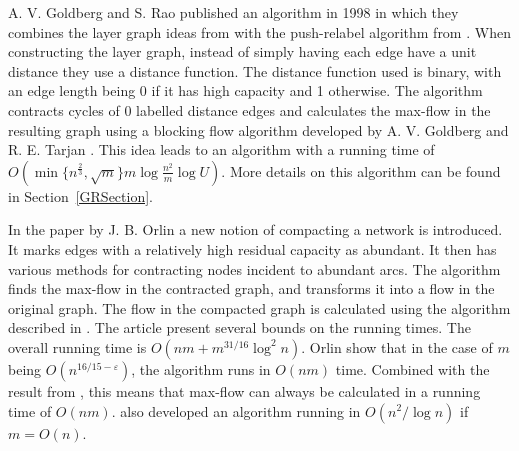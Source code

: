 A. V. Goldberg and S. Rao published an algorithm in 1998 \cite{Goldberg1998} in which they combines the layer graph ideas from \cite{dinic1970}
with the push-relabel algorithm from \cite{Goldberg1988}.
When constructing the layer graph, instead of simply having each edge have a unit distance they
use a distance function. The distance function used is binary, with an edge length 
being 0 if it has high capacity and 1 otherwise. 
The algorithm contracts cycles of 0 labelled distance edges and calculates the max-flow in the resulting graph 
using a blocking flow algorithm developed by A. V. Goldberg and R. E. Tarjan \cite{GoldbergTarjan1990}. This idea leads to an algorithm
with a running time of $O(\min{\{n^{\frac{2}{3}},\sqrt{m}\}}m\log{\frac{n^2}{m}}\log{U})$.
More details on this algorithm can be found in Section~\ref{GRSection}.

In the paper by J. B. Orlin \cite{Orlin13} a new notion of compacting a network is introduced. 
It marks edges with a relatively high residual capacity as abundant. It then has various methods for contracting nodes incident to abundant arcs.
The algorithm finds the max-flow in the contracted graph, and transforms it into a flow in the original graph. 
The flow in the compacted graph is calculated using the algorithm described in \cite{Goldberg1998}.
The article present several bounds on the running times. The overall running time is $O(nm + m^{31/16}\log^2{n})$. 
Orlin show that in the case of $m$ being $O(n^{16/15 - \varepsilon})$, the algorithm runs in $O(nm)$ time.
Combined with the result from \cite{King1992}, this means that max-flow can always be calculated in a running time of $O(nm)$.
\cite{Orlin13} also developed an algorithm running in $O\left(n^2/\log{n}\right)$ if \\
$m = O(n)$.

















